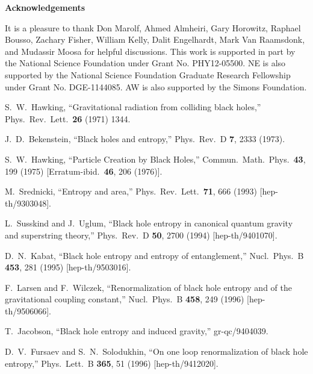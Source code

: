 \documentclass[12pt]{article}
\theoremstyle{remark}
\numberwithin{equation}{section}
\numberwithin{equation}{section}
\begin{document}
\vskip 2cm
\centerline{\bf Acknowledgements}
\vskip 1cm
\noindent It is a pleasure to thank Don Marolf, Ahmed Almheiri, Gary Horowitz, Raphael Bousso, Zachary Fisher, William Kelly, Dalit Engelhardt, Mark Van Raamsdonk, and Mudassir Moosa for helpful discussions. This work is supported in part by the National Science Foundation under Grant No. PHY12-05500. NE is also supported by the National Science Foundation Graduate Research Fellowship under Grant No. DGE-1144085. AW is also supported by the Simons Foundation.




\begin{thebibliography}{99}

  S.~W.~Hawking,
  ``Gravitational radiation from colliding black holes,''
  Phys.\ Rev.\ Lett.\  {\bf 26} (1971) 1344.

  J.~D.~Bekenstein,
  ``Black holes and entropy,''
  Phys.\ Rev.\ D {\bf 7}, 2333 (1973).

  S.~W.~Hawking,
  ``Particle Creation by Black Holes,''
  Commun.\ Math.\ Phys.\  {\bf 43}, 199 (1975)
  [Erratum-ibid.\  {\bf 46}, 206 (1976)].

  M.~Srednicki,
  ``Entropy and area,''
  Phys.\ Rev.\ Lett.\  {\bf 71}, 666 (1993)
  [hep-th/9303048].

  L.~Susskind and J.~Uglum,
  ``Black hole entropy in canonical quantum gravity and superstring theory,''
  Phys.\ Rev.\ D {\bf 50}, 2700 (1994)
  [hep-th/9401070].

D.~N.~Kabat,
  ``Black hole entropy and entropy of entanglement,''
  Nucl.\ Phys.\ B {\bf 453}, 281 (1995)
  [hep-th/9503016].

 F.~Larsen and F.~Wilczek,
  ``Renormalization of black hole entropy and of the gravitational coupling constant,''
  Nucl.\ Phys.\ B {\bf 458}, 249 (1996)
  [hep-th/9506066].

  T.~Jacobson,
  ``Black hole entropy and induced gravity,''
  gr-qc/9404039.

 D.~V.~Fursaev and S.~N.~Solodukhin,
  ``On one loop renormalization of black hole entropy,''
  Phys.\ Lett.\ B {\bf 365}, 51 (1996)
  [hep-th/9412020].


\end{thebibliography}
\end{document}
